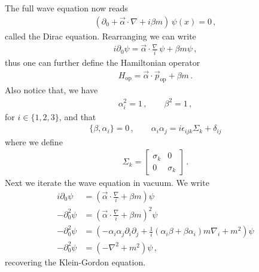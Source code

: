 \documentclass[11pt, onesided]{book}
\theoremstyle{break}
\theoremstyle{break}
\newcommand{\pd}{\partial}
\newcommand{\bmat}[1]{\begin{bmatrix} #1 \end{bmatrix}}
\begin{document}
The full wave equation now reads
\begin{align}
\left( \pd_0 + \vec{\alpha} \cdot \nabla  + i\beta m\right) \, \psi(x) = 0\,,
\end{align}
called the Dirac equation. Rearranging we can write
\begin{align*}
i\pd_0 \psi = \vec{\alpha} \cdot \frac{\nabla}{i} \, \psi + \beta m \psi\,,
\end{align*}
thus one can further define the Hamiltonian operator
\begin{align*}
H_{\text{op}} = \vec{\alpha}\cdot \vec{p}_{\text{op}} + \beta m\,.
\end{align*}
Also notice that, we have
\begin{align*}
\alpha_i^2 = 1 \,,\qquad
\beta^2 = 1\,,
\end{align*}
for $i \in \{1,2,3\}$, and that 
\begin{align*}
\{\beta, \alpha_i\} = 0\,,\qquad
\alpha_i \alpha_j = i\epsilon_{ijk}\Sigma_k + \delta_{ij}
\end{align*}
where we define
\begin{align*}
\Sigma_k = \bmat{\sigma_k & 0\\
0 & \sigma_k}\,.
\end{align*}
Next we iterate the wave equation in vacuum. We write
\begin{align*}
i \pd_0 \psi &= \left( \vec{\alpha}\cdot \frac{\nabla}{i}+\beta m\right) \psi\\
- \pd_0^2 \psi &= \left( \vec{\alpha}\cdot \frac{\nabla}{i}+\beta m\right)^2 \psi\\
- \pd_0^2 \psi &= \left(-\alpha_i \alpha_j \pd_i \pd_j + \frac{1}{i}\left( \alpha_i \beta + \beta \alpha_i \right) m \nabla_i + m^2 \right) \psi\\
- \pd_0^2 \psi&= \left(-\nabla^2 + m^2\right) \psi\,, \tag{4.5}
\end{align*}
\setcounter{equation}{5}
recovering the Klein-Gordon equation. \\
\end{document}
